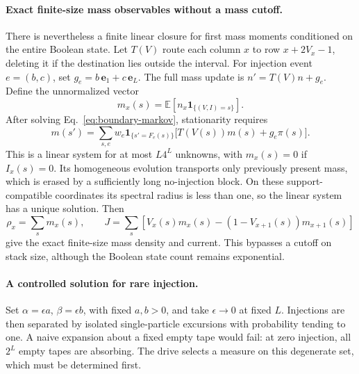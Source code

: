 \documentclass{article}
\begin{document}
\paragraph{Exact finite-size mass observables without a mass cutoff.}
There is nevertheless a finite linear closure for first mass moments
conditioned on the entire Boolean state.  Let $T(V)$ route each column $x$
to row $x+2V_x-1$, deleting it if the destination lies outside the interval.
For injection event $e=(b,c)$, set $g_e=b\,\mathbf e_1+c\,\mathbf e_L$.
The full mass update is $n'=T(V)n+g_e$.  Define the unnormalized vector
\begin{equation}
m_x(s)=\mathbb E\!\left[n_x\mathbf{1}_{\{(V,I)=s\}}\right].
\end{equation}
After solving Eq.~\eqref{eq:boundary-markov}, stationarity requires
\begin{equation}
m(s')=\sum_{s,e}w_e\mathbf{1}_{\{s'=F_e(s)\}}
 \bigl[T(V(s))m(s)+g_e\pi(s)\bigr].
\label{eq:conditional-mass-closure}
\end{equation}
This is a linear system for at most $L4^L$ unknowns, with $m_x(s)=0$ if
$I_x(s)=0$.  Its homogeneous evolution transports only previously present
mass, which is erased by a sufficiently long no-injection block.  On these
support-compatible coordinates its spectral radius is less than one, so
the linear system has a unique solution.  Then
\begin{equation}
\rho_x=\sum_s m_x(s),\qquad
J=\sum_s\left[V_x(s)m_x(s)
 -(1-V_{x+1}(s))m_{x+1}(s)\right]
\end{equation}
give the exact finite-size mass density and current.  This bypasses a
cutoff on stack size, although the Boolean state count remains exponential.

\paragraph{A controlled solution for rare injection.}
Set $\alpha=\epsilon a$, $\beta=\epsilon b$, with fixed $a,b>0$, and take
$\epsilon\to0$ at fixed $L$.  Injections are then separated by isolated
single-particle excursions with probability tending to one.  A naive
expansion about a fixed empty tape would fail: at zero injection, all
$2^L$ empty tapes are absorbing.  The drive selects a measure on this
degenerate set, which must be determined first.
\end{document}
